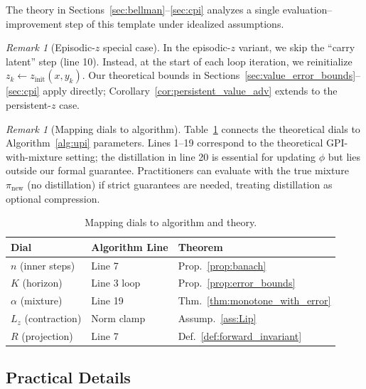 \documentclass{article}
\theoremstyle{plain}
\theoremstyle{definition}
\theoremstyle{remark}
\newtheorem{remark}[theorem]{Remark}
\newcommand{\longonly}[1]{}
\newcommand{\longonly}[1]{#1}
\begin{document}
{The theory in Sections~\ref{sec:bellman}--\ref{sec:cpi} analyzes a single evaluation--improvement step of this template under idealized assumptions.

\begin{remark}[Episodic-$z$ special case]
\label{rem:episodic_z_algo}
In the episodic-$z$ variant, we skip the ``carry latent'' step (line 10). Instead, at the start of each loop iteration, we reinitialize $z_k \gets z_{\mathrm{init}}(x,y_k)$.
Our theoretical bounds in Sections~\ref{sec:value_error_bounds}--\ref{sec:cpi} apply directly; Corollary~\ref{cor:persistent_value_adv} extends to the persistent-$z$ case.
\end{remark}

\begin{remark}[Mapping dials to algorithm]
Table~\ref{tab:dial_mapping} connects the theoretical dials to Algorithm~\ref{alg:upi} parameters.
Lines 1--19 correspond to the theoretical GPI-with-mixture setting; the distillation in line 20 is essential for updating $\phi$ but lies outside our formal guarantee.
Practitioners can evaluate with the true mixture $\pi_{\mathrm{new}}$ (no distillation) if strict guarantees are needed, treating distillation as optional compression.
\end{remark}

\begin{table}[t]
\caption{Mapping dials to algorithm and theory.}
\label{tab:dial_mapping}
\centering
\footnotesize
\begin{tabular*}{\columnwidth}{@{\extracolsep{\fill}}lll@{}}
\toprule
Dial & Algorithm Line & Theorem \\
\midrule
$n$ (inner steps) & Line 7 & Prop.~\ref{prop:banach}\longonly{, Cor.~\ref{cor:epsA_dials}} \\
$K$ (horizon) & Line 3 loop & Prop.~\ref{prop:error_bounds} \\
$\alpha$ (mixture) & Line 19 & Thm.~\ref{thm:monotone_with_error} \\
$L_z$ (contraction) & Norm clamp & Assump.~\ref{ass:Lip} \\
$R$ (projection) & Line 7 & Def.~\ref{def:forward_invariant} \\
\bottomrule
\end{tabular*}
\end{table}

\subsection{Practical Details}
\label{sec:practical}

}
\end{document}
